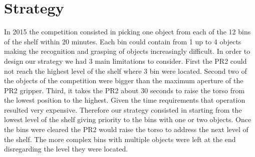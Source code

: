 \section{Strategy}
\label{sec:strategy}

In 2015 the competition consisted in picking one object from each of the 12 bins of the shelf within 20 minutes. Each bin could contain from 1 up to 4 objects making the recognition and grasping of objects increasingly difficult. In order to design our strategy we had 3 main limitations to consider. First the PR2 could not reach the highest level of the shelf where 3 bin were located. Second two of the objects of the competition were bigger than the maximum aperture of the PR2 gripper. Third, it takes the PR2 about 30 seconds to raise the torso from the lowest position to the highest. Given the time requirements that operation resulted very expensive. Therefore our strategy consisted in starting from the lowest level of the shelf giving priority to the bins with one or two objects. Once the bins were cleared the PR2 would raise the torso to address the next level of the shelf. The more complex bins with multiple objects were left at the end disregarding the level they were located.